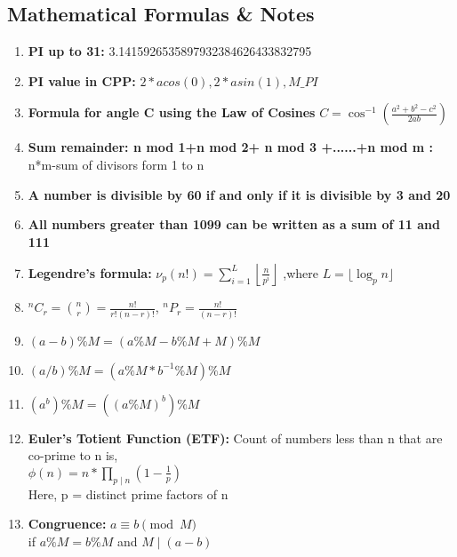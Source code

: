 \documentclass[10pt,a4paper,landscape]{article}
\begin{document}
\begin{multicols*}{3}
		\section{Mathematical Formulas \& Notes}
		\begin{enumerate}
			\item \textbf{PI up to 31: } 3.1415926535897932384626433832795
			\item \textbf{PI value in CPP: } $2*acos(0), 2*asin(1), M\_PI$
			
			\item\textbf{Formula for angle C using the Law of Cosines} $C = \cos^{-1} \left( \frac{a^2 + b^2 - c^2}{2ab} \right)$ 
			
			\item\textbf{Sum remainder: n mod 1+n mod 2+ n mod 3 +......+n mod m :} n*m-sum of divisors form 1 to n
			
			\item\textbf{A number is divisible by 60 if and only if it is divisible by 3 and 20}  
			
			\item\textbf{All numbers greater than 1099 can be written as a sum of 11 and 111} 
			
			\item\textbf{Legendre's formula:} $\nu _{p}(n!)=\sum _{i=1}^{L}\left\lfloor {\frac {n}{p^{i}}}\right\rfloor$
			,where ${L=\lfloor \log _{p}n\rfloor}$ 
			
			
			\item $^nC_r = \binom{n}{r} = \frac{n!}{r!(n-r)!}$, $^nP_r = \frac{n!}{(n-r)!}$
			
			\item $(a-b)\%M = (a\%M - b\%M + M)\%M$
			
			\item $(a/b)\%M = (a\%M * b^{-1}\%M)\%M$
			
			\item $(a^b)\%M = ((a\%M)^b)\%M$
			
			\item \textbf{Euler's Totient Function (ETF):} Count of numbers less than n that are co-prime to n is,\\ $\phi(n) = n * \prod_{p\mid n} (1 - \frac{1}{p})$\\Here, p = distinct prime factors of n
			
			\item \textbf{Congruence:} $a \equiv b \pmod{M}$\\ if $a\%M = b\%M$ and $M\mid(a-b)$
			

\end{enumerate}
\end{multicols*}
\end{document}
